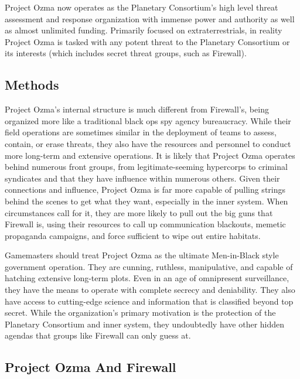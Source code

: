 Project Ozma now operates as the Planetary Consortium's
high level threat assessment and response
organization with immense power and authority as 
well as almost unlimited funding. Primarily focused 
on extraterrestrials, in reality Project Ozma is tasked 
with any potent threat to the Planetary Consortium 
or its interests (which includes secret threat groups, 
such as Firewall). 

\subsection{Methods }

Project Ozma's internal structure is much different 
from Firewall's, being organized more like a traditional
black ops spy agency bureaucracy. While their field
operations are sometimes similar in the deployment 
of teams to assess, contain, or erase threats, they also 
have the resources and personnel to conduct more 
long-term and extensive operations. It is likely that 
Project Ozma operates behind numerous front groups, 
from legitimate-seeming hypercorps to criminal syndicates
and that they have influence within numerous
others. Given their connections and influence, Project 
Ozma is far more capable of pulling strings behind the 
scenes to get what they want, especially in the inner 
system. When circumstances call for it, they are more 
likely to pull out the big guns that Firewall is, using 
their resources to call up communication blackouts, 
memetic propaganda campaigns, and force sufficient 
to wipe out entire habitats.

Gamemasters should treat Project Ozma as the ultimate
Men-in-Black style government operation. They
are cunning, ruthless, manipulative, and capable of 
hatching extensive long-term plots. Even in an age of 
omnipresent surveillance, they have the means to operate
with complete secrecy and deniability. They also
have access to cutting-edge science and information 
that is classified beyond top secret. While the organization's
primary motivation is the protection of
the Planetary Consortium and inner system, they 
undoubtedly have other hidden agendas that groups 
like Firewall can only guess at. 

\subsection{Project Ozma And Firewall }

